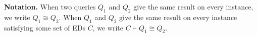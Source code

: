 \documentclass[preprint]{sigplanconf}
\newcommand{\FOR}{{\tt for} \ }
\newcommand{\WHERE}{{\tt where} \ }
\newcommand{\IN}{ \ {\tt in} \ }
\newcommand{\RETURN}{{\tt return} \ }
\begin{document}
{\bf Notation.}  When two queries $Q_1$ and $Q_2$ give the same result on every instance, we write $Q_1 \cong Q_2$.  When $Q_1$ and $Q_2$ give the same result on every instance satisfying some set of EDs $C$, we write $C \vdash Q_1 \cong Q_2$.


%
%
\end{document}
